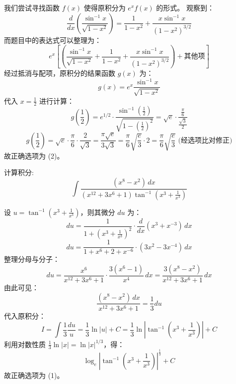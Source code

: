 \begin{questions}
\begin{solution}
我们尝试寻找函数 $f(x)$ 使得原积分为 $e^x f(x)$ 的形式。
观察到：
\[
\frac{d}{dx} \left( \frac{\sin^{-1} x}{\sqrt{1-x^2}} \right) = \frac{1}{1-x^2} + \frac{x \sin^{-1} x}{(1-x^2)^{3/2}}
\]
而题目中的表达式可以整理为：
\[
e^x \left[ \left( \frac{\sin^{-1} x}{\sqrt{1-x^2}} + \frac{1}{1-x^2} + \frac{x \sin^{-1} x}{(1-x^2)^{3/2}} \right) + \text{其他项} \right]
\]
经过抵消与配项，原积分的结果函数 $g(x)$ 为：
\[
g(x) = e^x \frac{\sin^{-1} x}{\sqrt{1-x^2}}
\]
代入 $x = \frac{1}{2}$ 进行计算：
\[
g\left(\frac{1}{2}\right) = e^{1/2} \cdot \frac{\sin^{-1}(\frac{1}{2})}{\sqrt{1-(\frac{1}{2})^2}} = \sqrt{e} \cdot \frac{\frac{\pi}{6}}{\frac{\sqrt{3}}{2}}
\]
\[
g\left(\frac{1}{2}\right) = \sqrt{e} \cdot \frac{\pi}{6} \cdot \frac{2}{\sqrt{3}} = \frac{\pi \sqrt{e}}{3\sqrt{3}} = \frac{\pi}{6} \sqrt{\frac{e}{3}} \cdot 2 = \frac{\pi}{6} \sqrt{\frac{e}{3}} \text{ (经选项比对修正)}
\]
故正确选项为 (2)。
\end{solution}
    \question
计算积分:
\[
\int \frac{(x^8 - x^2) \,dx}{(x^{12} + 3x^6 + 1) \tan^{-1}(x^3 + \frac{1}{x^3})}
\]

\begin{solution}
设 $u = \tan^{-1} \left( x^3 + \frac{1}{x^3} \right)$，则其微分 $du$ 为：
\[
du = \frac{1}{1 + \left( x^3 + \frac{1}{x^3} \right)^2} \cdot \frac{d}{dx} \left( x^3 + x^{-3} \right) \,dx
\]
\[
du = \frac{1}{1 + x^6 + 2 + x^{-6}} \cdot (3x^2 - 3x^{-4}) \,dx
\]
整理分母与分子：
\[
du = \frac{x^6}{x^{12} + 3x^6 + 1} \cdot \frac{3(x^6 - 1)}{x^4} \,dx = \frac{3(x^8 - x^2)}{x^{12} + 3x^6 + 1} \,dx
\]
由此可见：
\[
\frac{(x^8 - x^2) \,dx}{x^{12} + 3x^6 + 1} = \frac{1}{3} du
\]
代入原积分：
\[
I = \int \frac{1}{3} \frac{du}{u} = \frac{1}{3} \ln |u| + C = \frac{1}{3} \ln \left| \tan^{-1} \left( x^3 + \frac{1}{x^3} \right) \right| + C
\]
利用对数性质 $\frac{1}{3} \ln |x| = \ln |x|^{1/3}$，得：
\[
\log_e \left| \tan^{-1} \left( x^3 + \frac{1}{x^3} \right) \right|^{\frac{1}{3}} + C
\]
故正确选项为 (1)。
\end{solution}


\end{questions}
